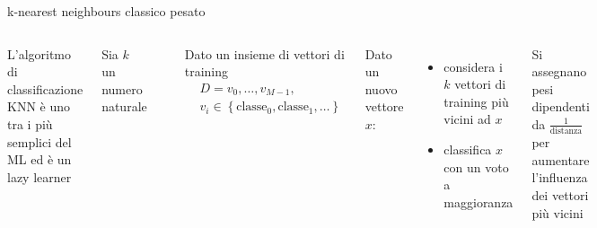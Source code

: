\documentclass{beamer}
\begin{document}
    \begin{frame}{k-nearest neighbours classico pesato}
        \begin{columns}
            L'algoritmo di classificazione KNN è uno tra i più semplici del ML ed è un lazy learner

            \vspace{.5cm}

            Sia $k$ un numero naturale 

            \begin{center}
                \includegraphics[width=.6\columnwidth]{gfx/KnnClassification.png}
            \end{center}


            Dato un insieme di vettori di training 
            \begin{equation*}
                \begin{split}
                    &D = v_0,\ldots,v_{M-1}, \\
                    &v_i\in\left\{ \text{classe}_0, \text{classe}_1, \ldots \right\}
                \end{split}
            \end{equation*}

            Dato un nuovo vettore $x$: 
            \begin{itemize}
                \item considera i $k$ vettori di training più vicini ad $x$
                \item classifica $x$ con un voto a maggioranza
            \end{itemize}

            Si assegnano pesi dipendenti da $\frac{1}{\text{distanza}}$ per aumentare l'influenza 
            dei vettori più vicini
        \end{columns}
    \end{frame}
\end{document}
